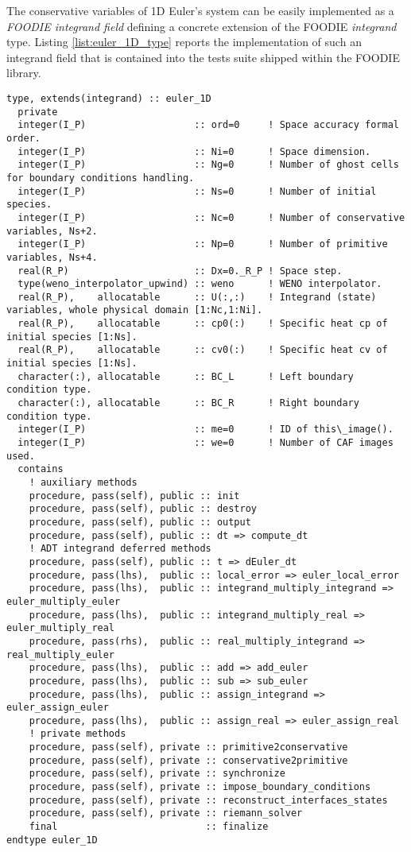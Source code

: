 The conservative variables of 1D Euler's system can be easily implemented as a \emph{FOODIE integrand field} defining a concrete extension of the FOODIE \emph{integrand} type. Listing \ref{list:euler_1D_type} reports the implementation of such an integrand field that is contained into the tests suite shipped within the FOODIE library.

\begin{lstlisting}[firstnumber=1,style=code,caption={implementation of the \emph{Euler 1D integrand} type},label={list:euler_1D_type}]
type, extends(integrand) :: euler_1D
  private
  integer(I_P)                   :: ord=0     ! Space accuracy formal order.
  integer(I_P)                   :: Ni=0      ! Space dimension.
  integer(I_P)                   :: Ng=0      ! Number of ghost cells for boundary conditions handling.
  integer(I_P)                   :: Ns=0      ! Number of initial species.
  integer(I_P)                   :: Nc=0      ! Number of conservative variables, Ns+2.
  integer(I_P)                   :: Np=0      ! Number of primitive variables, Ns+4.
  real(R_P)                      :: Dx=0._R_P ! Space step.
  type(weno_interpolator_upwind) :: weno      ! WENO interpolator.
  real(R_P),    allocatable      :: U(:,:)    ! Integrand (state) variables, whole physical domain [1:Nc,1:Ni].
  real(R_P),    allocatable      :: cp0(:)    ! Specific heat cp of initial species [1:Ns].
  real(R_P),    allocatable      :: cv0(:)    ! Specific heat cv of initial species [1:Ns].
  character(:), allocatable      :: BC_L      ! Left boundary condition type.
  character(:), allocatable      :: BC_R      ! Right boundary condition type.
  integer(I_P)                   :: me=0      ! ID of this\_image().
  integer(I_P)                   :: we=0      ! Number of CAF images used.
  contains
    ! auxiliary methods
    procedure, pass(self), public :: init
    procedure, pass(self), public :: destroy
    procedure, pass(self), public :: output
    procedure, pass(self), public :: dt => compute_dt
    ! ADT integrand deferred methods
    procedure, pass(self), public :: t => dEuler_dt
    procedure, pass(lhs),  public :: local_error => euler_local_error
    procedure, pass(lhs),  public :: integrand_multiply_integrand => euler_multiply_euler
    procedure, pass(lhs),  public :: integrand_multiply_real => euler_multiply_real
    procedure, pass(rhs),  public :: real_multiply_integrand => real_multiply_euler
    procedure, pass(lhs),  public :: add => add_euler
    procedure, pass(lhs),  public :: sub => sub_euler
    procedure, pass(lhs),  public :: assign_integrand => euler_assign_euler
    procedure, pass(lhs),  public :: assign_real => euler_assign_real
    ! private methods
    procedure, pass(self), private :: primitive2conservative
    procedure, pass(self), private :: conservative2primitive
    procedure, pass(self), private :: synchronize
    procedure, pass(self), private :: impose_boundary_conditions
    procedure, pass(self), private :: reconstruct_interfaces_states
    procedure, pass(self), private :: riemann_solver
    final                          :: finalize
endtype euler_1D
\end{lstlisting}

